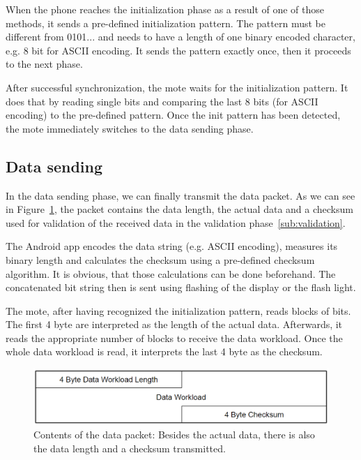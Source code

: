 \documentclass{sig-alternate} %
\begin{document}
When the phone reaches the initialization phase as a result of one of those methods, it sends a pre-defined initialization pattern.
The pattern must be different from 0101... and needs to have a length of one binary encoded character, e.g. 8 bit for ASCII encoding.
It sends the pattern exactly once, then it proceeds to the next phase.

After successful synchronization, the mote waits for the initialization pattern.
It does that by reading single bits and comparing the last 8 bits (for ASCII encoding) to the pre-defined pattern.
Once the init pattern has been detected, the mote immediately switches to the data sending phase.

\subsection{Data sending}
\label{sub:data_sending}

In the data sending phase, we can finally transmit the data packet.
As we can see in Figure~\ref{fig:data_packet}, the packet contains the data length, the actual data and a checksum used for validation of the received data in the validation phase~\ref{sub:validation}.

The Android app encodes the data string (e.g. ASCII encoding), measures its binary length and calculates the checksum using a pre-defined checksum algorithm.
It is obvious, that those calculations can be done beforehand.
The concatenated bit string then is sent using flashing of the display or the flash light.

The mote, after having recognized the initialization pattern, reads blocks of bits.
The first 4 byte are interpreted as the length of the actual data.
Afterwards, it reads the appropriate number of blocks to receive the data workload.
Once the whole data workload is read, it interprets the last 4 byte as the checksum.

\begin{figure}
	\centering
	\includegraphics[scale=.3]{images/data_packet.png}
	\caption{Contents of the data packet: Besides the actual data, there is also the data length and a checksum transmitted.}
	\label{fig:data_packet}
\end{figure}
\end{document}

